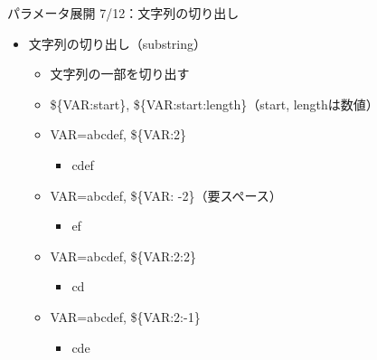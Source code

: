 \documentclass[12pt,aspectratio=169]{beamer}
\begin{document}
\begin{frame}{パラメータ展開 7/12：文字列の切り出し}

  \begin{itemize}
    \item 文字列の切り出し（substring）
      \begin{itemize}
        \item 文字列の一部を切り出す
        \item \$\{VAR:start\}, \$\{VAR:start:length\}（start, lengthは数値）
        \item VAR=abcdef, \$\{VAR:2\}
          \begin{itemize}
            \item cdef
          \end{itemize}
        \item VAR=abcdef, \$\{VAR: -2\}（要スペース）
          \begin{itemize}
            \item ef
          \end{itemize}
        \item VAR=abcdef, \$\{VAR:2:2\}
          \begin{itemize}
            \item cd
          \end{itemize}
        \item VAR=abcdef, \$\{VAR:2:-1\}
          \begin{itemize}
            \item cde
          \end{itemize}
      \end{itemize}

  \end{itemize}

\end{frame}
\end{document}

